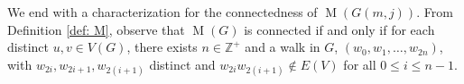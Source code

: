 \documentclass[12pt]{amsart}
\newtheorem{lemma}[theorem]{Lemma}
\theoremstyle{definition}
\theoremstyle{remark}
\numberwithin{equation}{section}
\numberwithin{figure}{section}
\newcommand{\M}{\operatorname{M}}
\newcommand{\Z}{\mathbb{Z}}
\begin{document}
We end with a characterization for the connectedness of $\M(G(m,j))$. From Definition \ref{def: M}, observe that $\M(G)$ is connected if and only if for each distinct $u,v\in V(G)$, there exists $n\in\Z^+$ and a walk in $G$, $(w_0,w_1,\ldots,w_{2n})$, with $w_{2i},w_{2i+1},w_{2(i+1)}$ distinct  and $w_{2i}w_{2(i+1)}\not\in E(V)$ for all $0\leq i \leq n-1$.

    
        
        
\end{document}
